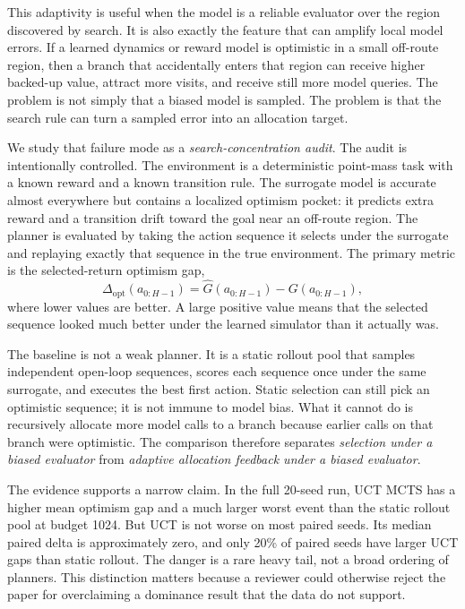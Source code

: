 \documentclass{article}
\newcommand{\gap}{\Delta_{\mathrm{opt}}}
\newcommand{\modelret}{\hat G}
\newcommand{\trueret}{G}
\begin{document}
This adaptivity is useful when the model is a reliable evaluator over the region discovered by search. It is also exactly the feature that can amplify local model errors. If a learned dynamics or reward model is optimistic in a small off-route region, then a branch that accidentally enters that region can receive higher backed-up value, attract more visits, and receive still more model queries. The problem is not simply that a biased model is sampled. The problem is that the search rule can turn a sampled error into an allocation target.

We study that failure mode as a \emph{search-concentration audit}. The audit is intentionally controlled. The environment is a deterministic point-mass task with a known reward and a known transition rule. The surrogate model is accurate almost everywhere but contains a localized optimism pocket: it predicts extra reward and a transition drift toward the goal near an off-route region. The planner is evaluated by taking the action sequence it selects under the surrogate and replaying exactly that sequence in the true environment. The primary metric is the selected-return optimism gap,
\[
\gap(a_{0:H-1}) = \modelret(a_{0:H-1}) - \trueret(a_{0:H-1}),
\]
where lower values are better. A large positive value means that the selected sequence looked much better under the learned simulator than it actually was.

The baseline is not a weak planner. It is a static rollout pool that samples independent open-loop sequences, scores each sequence once under the same surrogate, and executes the best first action. Static selection can still pick an optimistic sequence; it is not immune to model bias. What it cannot do is recursively allocate more model calls to a branch because earlier calls on that branch were optimistic. The comparison therefore separates \emph{selection under a biased evaluator} from \emph{adaptive allocation feedback under a biased evaluator}.

The evidence supports a narrow claim. In the full 20-seed run, UCT MCTS has a higher mean optimism gap and a much larger worst event than the static rollout pool at budget 1024. But UCT is not worse on most paired seeds. Its median paired delta is approximately zero, and only 20\% of paired seeds have larger UCT gaps than static rollout. The danger is a rare heavy tail, not a broad ordering of planners. This distinction matters because a reviewer could otherwise reject the paper for overclaiming a dominance result that the data do not support.
\end{document}
